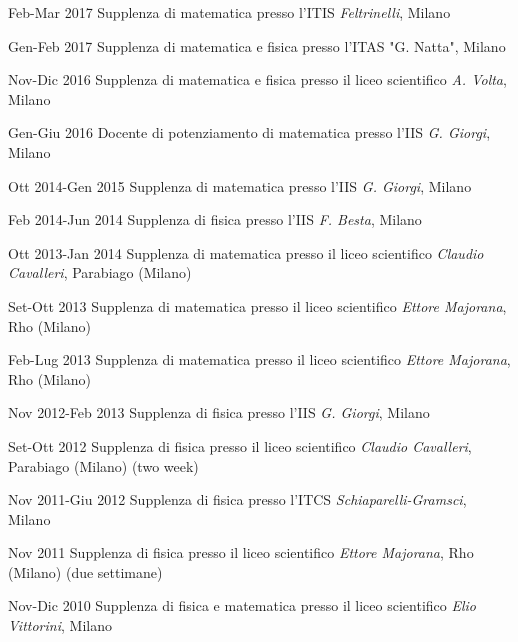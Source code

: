 \begin{CV}	
	\item[Feb-Mar 2017] Supplenza di matematica presso l'ITIS {\em Feltrinelli}, Milano
	
	\item[Gen-Feb 2017] Supplenza di matematica e fisica presso l'ITAS "G. Natta", Milano
	
	\item[Nov-Dic 2016] Supplenza di matematica e fisica presso il liceo scientifico {\em A. Volta}, Milano
	
	\item[Gen-Giu 2016] Docente di potenziamento di matematica presso l'IIS {\em G. Giorgi}, Milano
	
	\item[Ott 2014-Gen 2015] Supplenza di matematica presso l'IIS {\em G. Giorgi}, Milano
	
	\item[Feb 2014-Jun 2014] Supplenza di fisica presso l'IIS {\em F. Besta}, Milano
	
	\item[Ott 2013-Jan 2014] Supplenza di matematica presso il liceo scientifico {\em Claudio Cavalleri}, Parabiago (Milano)
	
	\item[Set-Ott 2013] Supplenza di matematica presso il liceo scientifico {\em Ettore Majorana}, Rho (Milano)
	
	\item[Feb-Lug 2013] Supplenza di matematica presso il liceo scientifico {\em Ettore Majorana}, Rho (Milano)
	
	\item[Nov 2012-Feb 2013] Supplenza di fisica presso l'IIS {\em G. Giorgi}, Milano
	
	\item[Set-Ott 2012] Supplenza di fisica presso il liceo scientifico {\em Claudio Cavalleri}, Parabiago (Milano) (two week)
	
	\item[Nov 2011-Giu 2012] Supplenza di fisica presso l'ITCS {\em Schiaparelli-Gramsci}, Milano
	
	\item[Nov 2011] Supplenza di fisica presso il liceo scientifico {\em Ettore Majorana}, Rho (Milano) (due settimane)
	
	\item[Nov-Dic 2010] Supplenza di fisica e matematica presso il liceo scientifico {\em Elio Vittorini}, Milano
	

\end{CV}
